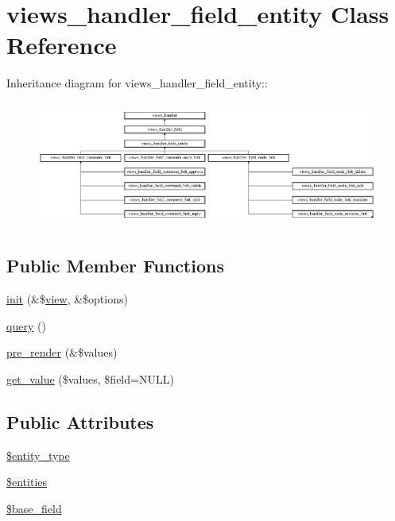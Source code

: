 \hypertarget{classviews__handler__field__entity}{
\section{views\_\-handler\_\-field\_\-entity Class Reference}
\label{classviews__handler__field__entity}
}
Inheritance diagram for views\_\-handler\_\-field\_\-entity::\begin{figure}[H]
\begin{center}
\leavevmode
\includegraphics[height=4.16357cm]{classviews__handler__field__entity}
\end{center}
\end{figure}
\subsection*{Public Member Functions}
\begin{DoxyCompactItemize}
\item 
\hyperlink{classviews__handler__field__entity_abf4b21db5fffaa1ddfdaca4896a40832}{init} (\&\$\hyperlink{classview}{view}, \&\$options)
\item 
\hyperlink{classviews__handler__field__entity_a71638207b6bd704ef4222b61f150c4af}{query} ()
\item 
\hyperlink{classviews__handler__field__entity_af42db39095ee851eb7cc34c8ea2e6beb}{pre\_\-render} (\&\$values)
\item 
\hyperlink{classviews__handler__field__entity_a79bd099a54975a492106311242054ccb}{get\_\-value} (\$values, \$field=NULL)
\end{DoxyCompactItemize}
\subsection*{Public Attributes}
\begin{DoxyCompactItemize}
\item 
\hyperlink{classviews__handler__field__entity_a3cdc8356629cbdff0c796b221029f372}{\$entity\_\-type}
\item 
\hyperlink{classviews__handler__field__entity_af6a62be21b01390fdc7aa7f3b06525bc}{\$entities}
\item 
\hyperlink{classviews__handler__field__entity_a92d166179b1d040f2df11192d886ee0b}{\$base\_\-field}
\end{DoxyCompactItemize}


